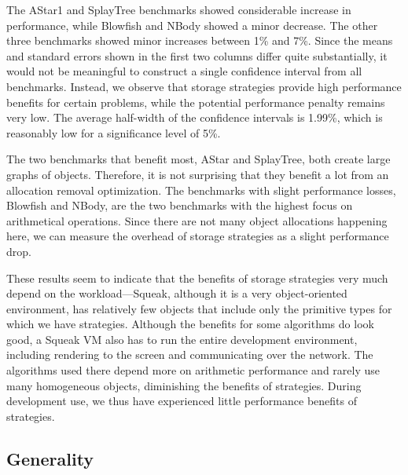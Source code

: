 \documentclass[english,10pt]{sigplanconf}
\begin{document}
The AStar1 and SplayTree benchmarks showed considerable increase in
performance, while Blowfish and NBody showed a minor decrease.  The
other three benchmarks showed minor increases between 1\% and 7\%.
Since the means and standard errors shown in the first two columns
differ quite substantially, it would not be meaningful to construct a
single confidence interval from all benchmarks.  Instead, we observe
that storage strategies provide high performance benefits for certain
problems, while the potential performance penalty remains very low.
The average half-width of the confidence intervals is 1.99\%, which is
reasonably low for a significance level of 5\%.

The two benchmarks that benefit most, AStar and SplayTree, both create
large graphs of objects.  Therefore, it is not surprising that they
benefit a lot from an allocation removal optimization.  The benchmarks
with slight performance losses, Blowfish and NBody, are the two
benchmarks with the highest focus on arithmetical operations.  Since
there are not many object allocations happening here, we can measure
the overhead of storage strategies as a slight performance drop.

These results seem to indicate that the benefits of storage strategies 
very much depend on the workload---Squeak,
although it is a very object-oriented environment, has relatively
few objects that include only the primitive types for which we have
strategies. Although the benefits for some algorithms do look good,
a Squeak VM also has to run the entire development environment, 
including rendering to the screen and communicating over the network.
The algorithms used there depend more on arithmetic performance and
rarely use many homogeneous objects, diminishing the benefits of
strategies. During development use, we thus have experienced little performance
benefits of strategies.






\subsection{Generality}
\end{document}
